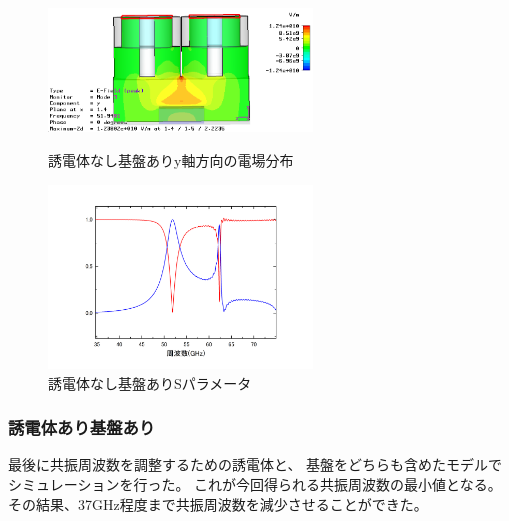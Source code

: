 \begin{figure}[h]
 \begin{minipage}{0.5\hsize}
  \begin{center}
   \includegraphics[width=70mm]{./image/model73_kiban_e_y_y.png}
  \end{center}
  \caption{誘電体なし基盤ありy軸方向の電場分布}
  \label{fig:one}
 \end{minipage}
 \begin{minipage}{0.5\hsize}
  \begin{center}
   \includegraphics[width=70mm]{./image/Graph5.jpg}
  \end{center}
  \caption{誘電体なし基盤ありSパラメータ}
  \label{fig:two}
 \end{minipage}
\end{figure}

\subsubsection{誘電体あり基盤あり}
最後に共振周波数を調整するための誘電体と、
基盤をどちらも含めたモデルでシミュレーションを行った。
これが今回得られる共振周波数の最小値となる。
その結果、37GHz程度まで共振周波数を減少させることができた。

